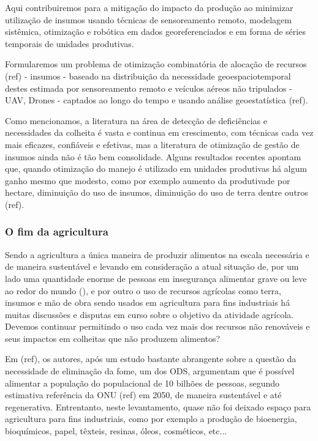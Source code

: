 \documentclass[14pt,a4paper]{article}
\begin{document}
	Aqui contribuiremos para a mitigação do impacto da produção ao minimizar utilização de insumos usando técnicas de sensoreamento remoto, modelagem sistêmica, otimização e robótica em dados georeferenciados e em forma de séries temporais de unidades produtivas. 
	
	Formularemos um problema de otimização combinatória de alocação de recursos (ref) - insumos - baseado na distribuição da necessidade geoespaciotemporal destes estimada por sensoreamento remoto e veículos aéreos não tripulados - UAV, Drones - captados ao longo do tempo e usando análise geoestatística (ref). 
	
	Como mencionamos, a literatura na área de detecção de deficiências e necessidades da colheita é vasta e continua em crescimento, com técnicas cada vez mais eficazes, confiáveis e efetivas, mas a literatura de otimização de gestão de insumos ainda não é tão bem consolidade. Alguns resultados recentes apontam que, quando otimização do manejo é utilizado em unidades produtivas há algum ganho mesmo que modesto, como por exemplo aumento da produtivade por hectare, diminuição do uso de insumos, diminuição do uso de terra dentre outros (ref).

    \subsubsection{O fim da agricultura}

		Sendo a agricultura a única maneira de produzir alimentos na escala necessária e de maneira sustentável e levando em consideração a atual situação de, por um lado uma quantidade enorme de pessoas em insegurança alimentar grave ou leve ao redor do mundo (), e por outro o uso de recursos agrícolas como terra, insumos e mão de obra sendo usados em agricultura para fins industriais há muitas discussões e disputas em curso sobre o objetivo da atividade agrícola. Devemos continuar permitindo o uso cada vez mais dos recursos não renováveis e seus impactos em colheitas que não produzem alimentos? 
				
		Em (ref), os autores, após um estudo bastante abrangente sobre a questão da necessidade de eliminação da fome, um dos ODS, argumentam que é possível alimentar a população do populacional de 10 bilhões de pessoas, segundo estimativa referência da ONU (ref) em 2050, de maneira sustentável e até regenerativa. Entrentanto, neste levantamento, quase não foi deixado espaço para agricultura para fins industriais, como por exemplo a produção de bioenergia, bioquímicos, papel, têxteis, resinas, óleos, cosméticos, etc...
		
\end{document}
